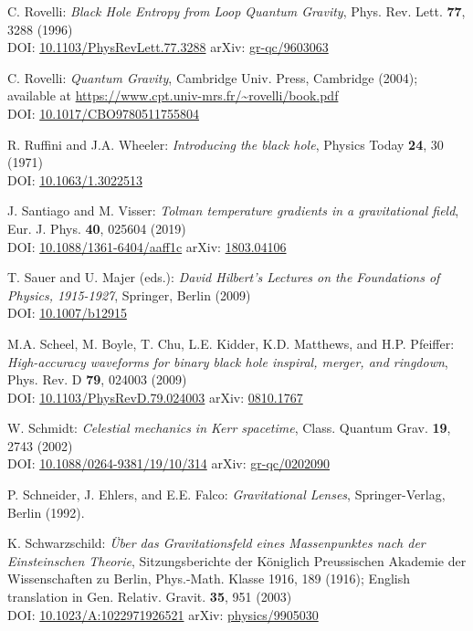 \begin{thebibliography}{123}
C. Rovelli:
{\em Black Hole Entropy from Loop Quantum Gravity},
Phys. Rev. Lett. {\bf 77}, 3288 (1996)\\
DOI: \href{https://doi.org/10.1103/PhysRevLett.77.3288}{10.1103/PhysRevLett.77.3288}\hfill
arXiv: \href{https://arxiv.org/abs/gr-qc/9603063}{gr-qc/9603063}

C. Rovelli:
{\em Quantum Gravity},
Cambridge Univ. Press, Cambridge (2004); available at
\url{https://www.cpt.univ-mrs.fr/~rovelli/book.pdf}\\
DOI: \href{https://doi.org/10.1017/CBO9780511755804}{10.1017/CBO9780511755804}

R. Ruffini and J.A. Wheeler:
{\em Introducing the black hole},
Physics Today {\bf 24}, 30 (1971)\\
DOI: \href{https://doi.org/10.1063/1.3022513}{10.1063/1.3022513}

J. Santiago and M. Visser:
{\em Tolman temperature gradients in a gravitational field},
Eur. J. Phys. {\bf 40}, 025604 (2019)\\
DOI: \href{https://doi.org/10.1088/1361-6404/aaff1c}{10.1088/1361-6404/aaff1c}\hfill
arXiv: \href{https://arxiv.org/abs/1803.04106}{1803.04106}

T. Sauer and U. Majer (eds.):
{\em David Hilbert’s Lectures on the Foundations of Physics, 1915-1927},
Springer, Berlin (2009)\\
DOI: \href{https://doi.org/10.1007/b12915}{10.1007/b12915}

M.A. Scheel, M. Boyle, T. Chu, L.E. Kidder, K.D. Matthews, and H.P. Pfeiffer:
{\em High-accuracy waveforms for binary black hole inspiral, merger, and ringdown},
Phys. Rev. D {\bf 79}, 024003 (2009)\\
DOI: \href{https://doi.org/10.1103/PhysRevD.79.024003}{10.1103/PhysRevD.79.024003}\hfill
arXiv: \href{https://arxiv.org/abs/0810.1767}{0810.1767}

W. Schmidt:
{\em Celestial mechanics in Kerr spacetime},
Class. Quantum Grav. {\bf 19}, 2743 (2002)\\
DOI: \href{https://doi.org/10.1088/0264-9381/19/10/314}{10.1088/0264-9381/19/10/314}\hfill
arXiv: \href{https://arxiv.org/abs/gr-qc/0202090}{gr-qc/0202090}

P. Schneider, J. Ehlers, and E.E. Falco:
{\em Gravitational Lenses},
Springer-Verlag, Berlin (1992).

K. Schwarzschild:
{\em \"Uber das Gravitationsfeld eines Massenpunktes nach der Einsteinschen Theorie},
Sitzungsberichte der K\"oniglich Preussischen Akademie der Wissenschaften zu Berlin, Phys.-Math. Klasse 1916, 189 (1916);
English translation in Gen. Relativ. Gravit. {\bf 35}, 951 (2003)\\
DOI: \href{https://doi.org/10.1023/A:1022971926521}{10.1023/A:1022971926521}\hfill
arXiv: \href{https://arxiv.org/abs/physics/9905030}{physics/9905030}


\end{thebibliography}
